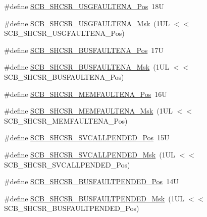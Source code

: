 \begin{DoxyCompactItemize}
\item 
\#define \hyperlink{group___c_m_s_i_s___s_c_b_gae71949507636fda388ec11d5c2d30b52}{S\+C\+B\+\_\+\+S\+H\+C\+S\+R\+\_\+\+U\+S\+G\+F\+A\+U\+L\+T\+E\+N\+A\+\_\+\+Pos}~18U
\item 
\#define \hyperlink{group___c_m_s_i_s___s_c_b_ga056fb6be590857bbc029bed48b21dd79}{S\+C\+B\+\_\+\+S\+H\+C\+S\+R\+\_\+\+U\+S\+G\+F\+A\+U\+L\+T\+E\+N\+A\+\_\+\+Msk}~(1\+U\+L $<$$<$ S\+C\+B\+\_\+\+S\+H\+C\+S\+R\+\_\+\+U\+S\+G\+F\+A\+U\+L\+T\+E\+N\+A\+\_\+\+Pos)
\item 
\#define \hyperlink{group___c_m_s_i_s___s_c_b_ga3d32edbe4a5c0335f808cfc19ec7e844}{S\+C\+B\+\_\+\+S\+H\+C\+S\+R\+\_\+\+B\+U\+S\+F\+A\+U\+L\+T\+E\+N\+A\+\_\+\+Pos}~17U
\item 
\#define \hyperlink{group___c_m_s_i_s___s_c_b_ga43e8cbe619c9980e0d1aacc85d9b9e47}{S\+C\+B\+\_\+\+S\+H\+C\+S\+R\+\_\+\+B\+U\+S\+F\+A\+U\+L\+T\+E\+N\+A\+\_\+\+Msk}~(1\+U\+L $<$$<$ S\+C\+B\+\_\+\+S\+H\+C\+S\+R\+\_\+\+B\+U\+S\+F\+A\+U\+L\+T\+E\+N\+A\+\_\+\+Pos)
\item 
\#define \hyperlink{group___c_m_s_i_s___s_c_b_ga685b4564a8760b4506f14ec4307b7251}{S\+C\+B\+\_\+\+S\+H\+C\+S\+R\+\_\+\+M\+E\+M\+F\+A\+U\+L\+T\+E\+N\+A\+\_\+\+Pos}~16U
\item 
\#define \hyperlink{group___c_m_s_i_s___s_c_b_gaf084424fa1f69bea36a1c44899d83d17}{S\+C\+B\+\_\+\+S\+H\+C\+S\+R\+\_\+\+M\+E\+M\+F\+A\+U\+L\+T\+E\+N\+A\+\_\+\+Msk}~(1\+U\+L $<$$<$ S\+C\+B\+\_\+\+S\+H\+C\+S\+R\+\_\+\+M\+E\+M\+F\+A\+U\+L\+T\+E\+N\+A\+\_\+\+Pos)
\item 
\#define \hyperlink{group___c_m_s_i_s___s_c_b_ga2f93ec9b243f94cdd3e94b8f0bf43641}{S\+C\+B\+\_\+\+S\+H\+C\+S\+R\+\_\+\+S\+V\+C\+A\+L\+L\+P\+E\+N\+D\+E\+D\+\_\+\+Pos}~15U
\item 
\#define \hyperlink{group___c_m_s_i_s___s_c_b_ga6095a7acfbad66f52822b1392be88652}{S\+C\+B\+\_\+\+S\+H\+C\+S\+R\+\_\+\+S\+V\+C\+A\+L\+L\+P\+E\+N\+D\+E\+D\+\_\+\+Msk}~(1\+U\+L $<$$<$ S\+C\+B\+\_\+\+S\+H\+C\+S\+R\+\_\+\+S\+V\+C\+A\+L\+L\+P\+E\+N\+D\+E\+D\+\_\+\+Pos)
\item 
\#define \hyperlink{group___c_m_s_i_s___s_c_b_gaa22551e24a72b65f1e817f7ab462203b}{S\+C\+B\+\_\+\+S\+H\+C\+S\+R\+\_\+\+B\+U\+S\+F\+A\+U\+L\+T\+P\+E\+N\+D\+E\+D\+\_\+\+Pos}~14U
\item 
\#define \hyperlink{group___c_m_s_i_s___s_c_b_ga677c23749c4d348f30fb471d1223e783}{S\+C\+B\+\_\+\+S\+H\+C\+S\+R\+\_\+\+B\+U\+S\+F\+A\+U\+L\+T\+P\+E\+N\+D\+E\+D\+\_\+\+Msk}~(1\+U\+L $<$$<$ S\+C\+B\+\_\+\+S\+H\+C\+S\+R\+\_\+\+B\+U\+S\+F\+A\+U\+L\+T\+P\+E\+N\+D\+E\+D\+\_\+\+Pos)
$$
\end{DoxyCompactItemize}
